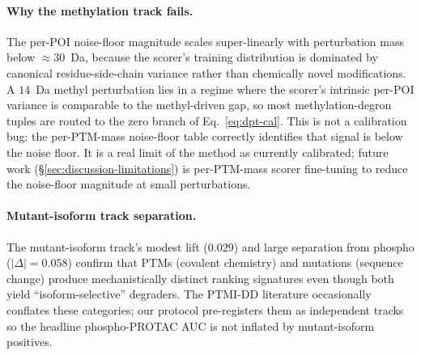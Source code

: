 \paragraph{Why the methylation track fails.} The per-POI noise-floor magnitude scales super-linearly with perturbation mass below $\approx 30$~Da, because the scorer's training distribution is dominated by canonical residue-side-chain variance rather than chemically novel modifications. A $14$~Da methyl perturbation lies in a regime where the scorer's intrinsic per-POI variance is comparable to the methyl-driven gap, so most methylation-degron tuples are routed to the zero branch of Eq.~\ref{eq:dpt-cal}. This is not a calibration bug: the per-PTM-mass noise-floor table correctly identifies that signal is below the noise floor. It is a real limit of the method as currently calibrated; future work (\S\ref{sec:discussion-limitations}) is per-PTM-mass scorer fine-tuning to reduce the noise-floor magnitude at small perturbations.

\paragraph{Mutant-isoform track separation.} The mutant-isoform track's modest lift ($0.029$) and large separation from phospho ($|\Delta| = 0.058$) confirm that PTMs (covalent chemistry) and mutations (sequence change) produce mechanistically distinct ranking signatures even though both yield ``isoform-selective'' degraders. The PTMI-DD literature occasionally conflates these categories; our protocol pre-registers them as independent tracks so the headline phospho-PROTAC AUC is not inflated by mutant-isoform positives.
